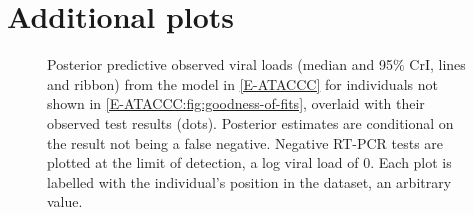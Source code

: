 \documentclass[thesis.tex]{subfiles}
\begin{document}
\chapter{Additional plots}

\begin{figure}
  \caption[Remaining ATACCC posterior predictive viral load fits]{
    Posterior predictive observed viral loads (median and 95\% CrI, lines and ribbon) from the model in \cref{E-ATACCC} for individuals not shown in \cref{E-ATACCC:fig:goodness-of-fits}, overlaid with their observed test results (dots). Posterior estimates are conditional on the result not being a false negative. Negative RT-PCR tests are plotted at the limit of detection, \ie a log viral load of 0. Each plot is labelled with the individual's position in the dataset, an arbitrary value.
  }
    \label{ATACCC:fig:appendix-goodness-of-fits}
\end{figure}
\end{document}
